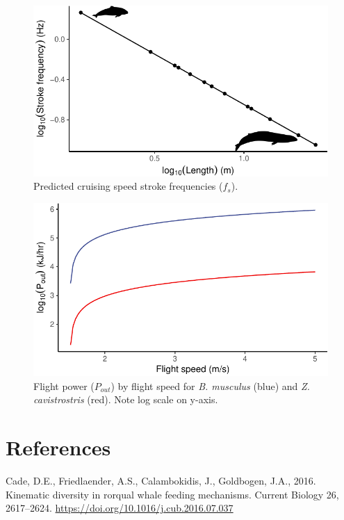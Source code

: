 \documentclass[]{elsarticle} %
\makeatletter
\def\maxwidth{\ifdim\Gin@nat@width>\linewidth\linewidth
\else\Gin@nat@width\fi}
\let\Oldincludegraphics\includegraphics
\renewcommand{\includegraphics}[1]{\Oldincludegraphics[width=\maxwidth]{#1}}
\makeatother
\begin{document}
\begin{figure}
\centering
\includegraphics{Sonar_Response_Manuscript_files/figure-latex/fs_fig-1.pdf}
\caption{Predicted cruising speed stroke frequencies (\(f_s\)).
\label{fs_fig}}
\end{figure}

\begin{figure}
\centering
\includegraphics{Sonar_Response_Manuscript_files/figure-latex/Pout_fig-1.pdf}
\caption{Flight power (\(P_{out}\)) by flight speed for
\textit{B. musculus} (blue) and \textit{Z. cavistrostris} (red). Note
log scale on y-axis. \label{Pout_fig}}
\end{figure}

\section*{References}\label{references}

\hypertarget{refs}{}
\hypertarget{ref-cade_kinematic_2016}{}
Cade, D.E., Friedlaender, A.S., Calambokidis, J., Goldbogen, J.A., 2016.
Kinematic diversity in rorqual whale feeding mechanisms. Current Biology
26, 2617--2624. \url{https://doi.org/10.1016/j.cub.2016.07.037}
\end{document}
